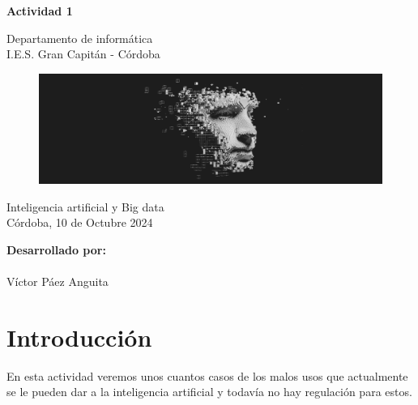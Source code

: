 \documentclass[12pt]{article}
\begin{document}
\begin{titlepage}
    \begin{center}
      \Large \bfseries{}
    \end{center}
    \vspace{0.8cm}
    \begin{center}
      \Large \bfseries{}
    \end{center}
    \vspace{0.8cm}
    \begin{center}
     \Large \bfseries{Actividad 1}
    \end{center}
    \vspace{0.0001cm}
    \begin{center}
        Departamento de informática \\ I.E.S. Gran Capitán - Córdoba
    \end{center}
        \vspace{2 cm}
\begin{figure}[h!]
    \centering
    \includegraphics[width=.9\textwidth]{ia.jpg}
    \label{fig:my_label}
\end{figure}
    \vspace{0.2 cm}
    \begin{center}
        Inteligencia artificial y Big data \\ Córdoba, 10 de Octubre 2024
    \end{center}
    \vspace{6 cm}
\null\hfill \textbf{Desarrollado por:}
\\
\\
\null\hfill Víctor Páez Anguita
\clearpage
\end{titlepage}

\tableofcontents
\clearpage

\section{Introducción}
En esta actividad veremos unos cuantos casos de los malos usos que actualmente se le pueden dar a la inteligencia artificial y todavía no hay regulación para estos.
\end{document}
